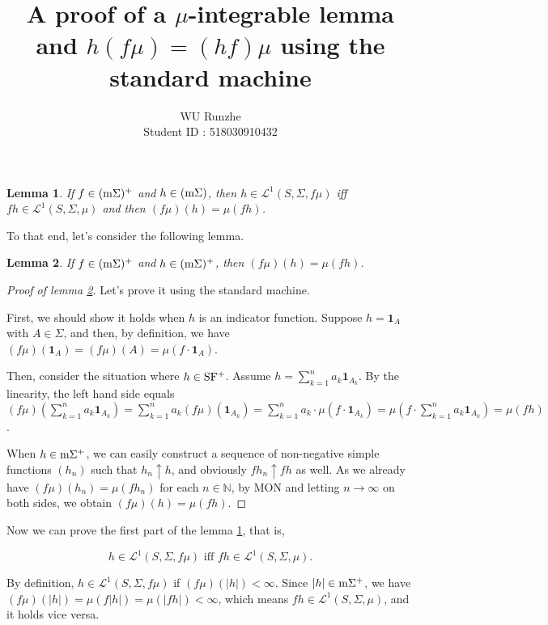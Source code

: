 \documentclass[12pt]{article}
\title{A proof of a $\mu$-integrable lemma and $h(f\mu)=(hf)\mu$ using the standard machine}
\author{WU Runzhe\\
	Student ID : 518030910432}
\date{}
\newcommand\bN{\mathbb{N}}
\newcommand{\ind}[1]{\mathbf{1}_{#1}}
\newcommand{\ms}{\rm{m}\Sigma}
\newtheorem{lemma}{Lemma}
\begin{document}
	\maketitle \large
	
	\begin{tcolorbox}
		\begin{lemma}\label{ll}
			If $f\in (\ms)^+$ and $h\in (\ms)$, then $h\in \mathcal{L}^1(S,\Sigma,f\mu)$ iff $fh\in \mathcal{L}^1(S,\Sigma,\mu)$ and then $(f\mu)(h)=\mu(fh)$.
		\end{lemma}
	\end{tcolorbox}

	To that end, let's consider the following lemma.
	
	\begin{lemma}\label{l1}
		If $f\in (\ms)^+$ and $h\in (\ms)^+$, then $(f\mu)(h)=\mu(fh)$.
	\end{lemma}

	\begin{proof}[Proof of lemma \ref{l1}]
		
		Let's prove it using the standard machine.
		
		First, we should show it holds when $h$ is an indicator function. Suppose $h=\ind{A}$ with $A\in\Sigma$, and then, by definition, we have $(f\mu)(\ind{A})=(f\mu)(A)=\mu(f\cdot \ind{A})$.
		
		Then, consider the situation where $h\in \rm{SF^+}$. Assume $h=\sum_{k=1}^na_k\ind{A_k}$. By the linearity, the left hand side equals $(f\mu)(\sum_{k=1}^na_k\ind{A_k})=\sum_{k=1}^n a_k(f\mu)(\ind{A_k})=\sum_{k=1}^n a_k\cdot\mu(f\cdot \ind{A_k})=\mu(f\cdot \sum_{k=1}^n a_k\ind{A_k})=\mu(fh)$.
		
		When $h\in \ms^+$, we can easily construct a sequence of non-negative simple functions $(h_n)$ such that $h_n\uparrow h$, and obviously $fh_n\uparrow fh$ as well. As we already have $(f\mu)(h_n)=\mu(fh_n)$ for each $n\in\bN$, by MON and letting $n\rightarrow \infty$ on both sides, we obtain $(f\mu)(h)=\mu(fh)$.
		
	\end{proof}

	Now we can prove the first part of the lemma \ref{ll}, that is,                                      
	
	$$h\in \mathcal{L}^1(S,\Sigma,f\mu) \text{ iff } fh\in \mathcal{L}^1(S,\Sigma,\mu).$$
	
	By definition, $h\in \mathcal{L}^1(S,\Sigma,f\mu)$ if $(f\mu)(|h|)<\infty$. Since $|h|\in \ms^+$, we have $(f\mu)(|h|)=\mu(f|h|)=\mu(|fh|)<\infty$, which means $fh\in \mathcal{L}^1(S,\Sigma,\mu)$, and it holds vice versa.
	
\end{document}
